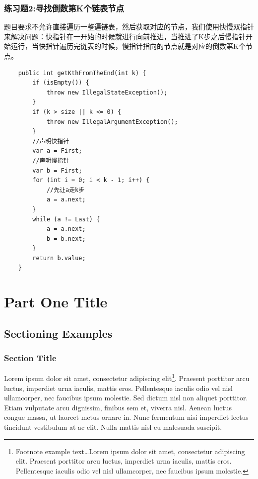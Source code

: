 \documentclass[
	11pt,
	fleqn,
	a4paper,
]{LegrandOrangeBook}
\begin{document}
\section{练习题2:寻找倒数第K个链表节点}
\begin{example}
	题目要求不允许直接遍历一整遍链表，然后获取对应的节点，我们使用快慢双指针来解决问题：快指针在一开始的时候就进行向前推进，当推进了K步之后慢指针开始运行，当快指针遍历完链表的时候，慢指针指向的节点就是对应的倒数第K个节点。
\end{example}
\begin{verbatim}
    public int getKthFromTheEnd(int k) {
        if (isEmpty()) {
            throw new IllegalStateException();
        }
        if (k > size || k <= 0) {
            throw new IllegalArgumentException();
        }
        //声明快指针
        var a = First;
        //声明慢指针
        var b = First;
        for (int i = 0; i < k - 1; i++) {
            //先让a走k步
            a = a.next;
        }
        while (a != Last) {
            a = a.next;
            b = b.next;
        }
        return b.value;
    }
\end{verbatim}
\part{Part One Title}


\chapterspaceabove{6.75cm} %
\chapterspacebelow{7.25cm} %


\chapter{Sectioning Examples}

\section{Section Title}

Lorem ipsum dolor sit amet, consectetur adipiscing elit\footnote{Footnote example text\ldots Lorem ipsum dolor sit amet, consectetur adipiscing elit. Praesent porttitor arcu luctus, imperdiet urna iaculis, mattis eros. Pellentesque iaculis odio vel nisl ullamcorper, nec faucibus ipsum molestie.}. Praesent porttitor arcu luctus, imperdiet urna iaculis, mattis eros. Pellentesque iaculis odio vel nisl ullamcorper, nec faucibus ipsum molestie. Sed dictum nisl non aliquet porttitor. Etiam vulputate arcu dignissim, finibus sem et, viverra nisl. Aenean luctus congue massa, ut laoreet metus ornare in. Nunc fermentum nisi imperdiet lectus tincidunt vestibulum at ac elit. Nulla mattis nisl eu malesuada suscipit.
\end{document}
